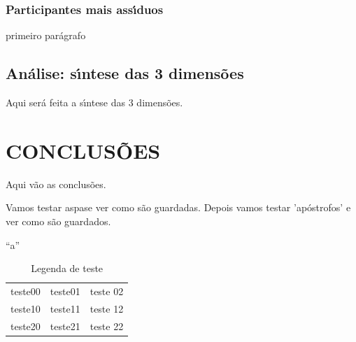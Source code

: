 \documentclass[
12pt,		%
openright,	%
twoside,  %
a4paper,			%
chapter=TITLE,		%
english,			%
french,				%
spanish,			%
brazil				%
]{USPSC-classe/USPSC_RedarTex}
\begin{document}
\subsection[Participantes mais ass\'{\i}duos]{Participantes mais ass\'{\i}duos}\label{Participantes mais ass\'{\i}duos}
primeiro par\'agrafo








\section[An\'alise: s\'{\i}ntese das 3 dimens\~oes]{An\'alise: s\'{\i}ntese das 3 dimens\~oes}\label{An\'alise: s\'{\i}ntese das 3 dimens\~oes}
Aqui ser\'a feita a s\'{\i}ntese das 3 dimens\~oes.








\chapter[CONCLUS\~OES]{CONCLUS\~OES}\label{CONCLUS\~OES}
Aqui v\~ao as conclus\~oes.








Vamos testar \textquotedbl aspas\textquotedbl  e ver como s\~ao guardadas. Depois vamos testar 'ap\'ostrofos' e ver como s\~ao guardados.








``a''












\begin{table}[htb]
\caption{\label{96a5858fd2e287fed4b65c001ce7de8de2d2fc5b}Legenda de teste}

\centering
\begin{tabular}{|c|c|c|}
\hline
teste00  &  teste01  &  teste 02 \\
teste10  &  teste11  &  teste 12 \\
teste20  &  teste21  &  teste 22 \\
\hline
\end{tabular}
\end{table}
\end{document}
